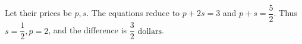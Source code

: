 Let their prices be $p,s$. The equations reduce to $p+2s=3$ and $p+s=\dfrac{5}{2}$. Thus $s=\dfrac{1}{2},p=2$, and the difference is $\boxed{\dfrac{3}{2}\text{ dollars}}$.

